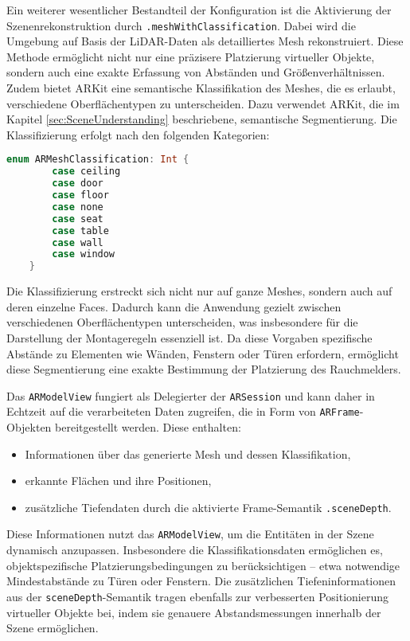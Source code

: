Ein weiterer wesentlicher Bestandteil der Konfiguration ist die Aktivierung der Szenenrekonstruktion durch \texttt{.meshWithClassification}. Dabei wird die Umgebung auf Basis der LiDAR-Daten als detailliertes Mesh rekonstruiert. Diese Methode ermöglicht nicht nur eine präzisere Platzierung virtueller Objekte, sondern auch eine exakte Erfassung von Abständen und Größenverhältnissen. Zudem bietet ARKit eine semantische Klassifikation des Meshes, die es erlaubt, verschiedene Oberflächentypen zu unterscheiden. Dazu verwendet ARKit, die im Kapitel \ref{sec:SceneUnderstanding} beschriebene, semantische Segmentierung. Die Klassifizierung erfolgt nach den folgenden Kategorien:

\begin{lstlisting}[language=Swift]
    enum ARMeshClassification: Int {
        case ceiling
        case door
        case floor
        case none
        case seat
        case table  
        case wall
        case window
    }
\end{lstlisting}

Die Klassifizierung erstreckt sich nicht nur auf ganze Meshes, sondern auch auf deren einzelne Faces. Dadurch kann die Anwendung gezielt zwischen verschiedenen Oberflächentypen unterscheiden, was insbesondere für die Darstellung der Montageregeln essenziell ist. Da diese Vorgaben spezifische Abstände zu Elementen wie Wänden, Fenstern oder Türen erfordern, ermöglicht diese Segmentierung eine exakte Bestimmung der Platzierung des Rauchmelders.

Das \texttt{ARModelView} fungiert als Delegierter der \texttt{ARSession} und kann daher in Echtzeit auf die verarbeiteten Daten zugreifen, die in Form von \texttt{ARFrame}-Objekten bereitgestellt werden. Diese enthalten:

\begin{itemize}
    \item Informationen über das generierte Mesh und dessen Klassifikation,
    \item erkannte Flächen und ihre Positionen,
    \item zusätzliche Tiefendaten durch die aktivierte Frame-Semantik \texttt{.sceneDepth}.
\end{itemize}

Diese Informationen nutzt das \texttt{ARModelView}, um die Entitäten in der Szene dynamisch anzupassen. Insbesondere die Klassifikationsdaten ermöglichen es, objektspezifische Platzierungsbedingungen zu berücksichtigen – etwa notwendige Mindestabstände zu Türen oder Fenstern. Die zusätzlichen Tiefeninformationen aus der \texttt{sceneDepth}-Semantik tragen ebenfalls zur verbesserten Positionierung virtueller Objekte bei, indem sie genauere Abstandsmessungen innerhalb der Szene ermöglichen.


